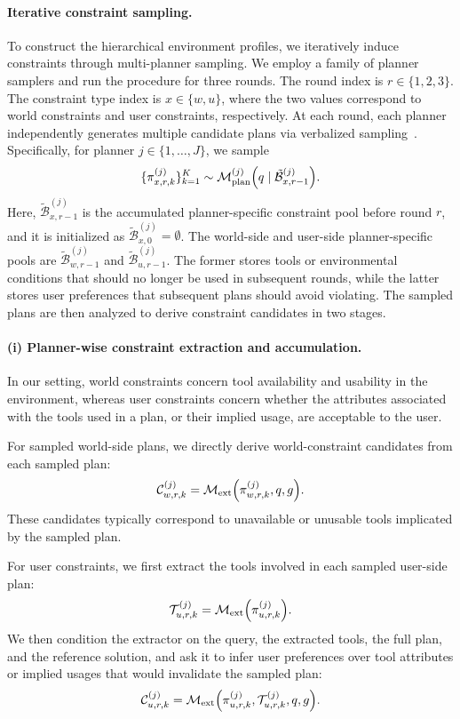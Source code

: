 \paragraph{Iterative constraint sampling.}
To construct the hierarchical environment profiles, we iteratively induce constraints through multi-planner sampling. We employ a family of planner samplers and run the procedure for three rounds. The round index is $r \in \{1,2,3\}$.
The constraint type index is $x \in \{w,u\}$, where the two values correspond to world constraints and user constraints, respectively.
At each round, each planner independently generates multiple candidate plans via verbalized sampling~\citep{verbalized-sampling}. Specifically, for planner $j \in \{1,\dots,J\}$, we sample
\[
\{\pi^{(j)}_{x,r,k}\}_{k=1}^{K}
\sim
\mathcal{M}^{(j)}_{\mathrm{plan}}
\Bigl(
q
\mid
\tilde{\mathcal{B}}^{(j)}_{x,r-1}
\Bigr).
\]
Here, $\tilde{\mathcal{B}}^{(j)}_{x,r-1}$ is the accumulated planner-specific constraint pool before round $r$, and it is initialized as $\tilde{\mathcal{B}}^{(j)}_{x,0}
=
\emptyset$.
The world-side and user-side planner-specific pools are $\tilde{\mathcal{B}}^{(j)}_{w,r-1}$ and $\tilde{\mathcal{B}}^{(j)}_{u,r-1}$.
The former stores tools or environmental conditions that should no longer be used in subsequent rounds, while the latter stores user preferences that subsequent plans should avoid violating. The sampled plans are then analyzed to derive constraint candidates in two stages.

\paragraph{(i) Planner-wise constraint extraction and accumulation.}
In our setting, world constraints concern tool availability and usability in the environment, whereas user constraints concern whether the attributes associated with the tools used in a plan, or their implied usage, are acceptable to the user. 

For sampled world-side plans, we directly derive world-constraint candidates from each sampled plan:
\[
\mathcal{C}^{(j)}_{w,r,k}
=
\mathcal{M}_{\mathrm{ext}}
\Bigl(
\pi^{(j)}_{w,r,k},
q,
g
\Bigr).
\]
These candidates typically correspond to unavailable or unusable tools implicated by the sampled plan.

For user constraints, we first extract the tools involved in each sampled user-side plan:
\[
\mathcal{T}^{(j)}_{u,r,k}
=
\mathcal{M}_{\mathrm{ext}}
\Bigl(
\pi^{(j)}_{u,r,k}
\Bigr).
\]
We then condition the extractor on the query, the extracted tools, the full plan, and the reference solution, and ask it to infer user preferences over tool attributes or implied usages that would invalidate the sampled plan:
\[
\mathcal{C}^{(j)}_{u,r,k}
=
\mathcal{M}_{\mathrm{ext}}
\Bigl(
\pi^{(j)}_{u,r,k},
\mathcal{T}^{(j)}_{u,r,k},
q,
g
\Bigr).
\]

